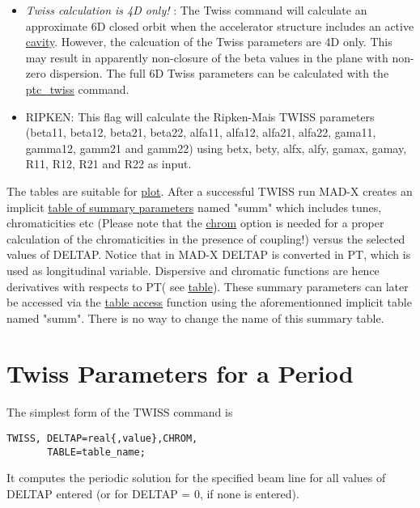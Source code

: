 \begin{itemize}
   \item \textit{ Twiss calculation is 4D only!} : The Twiss
     command will calculate an approximate 6D closed orbit when the
     accelerator structure includes an active
     \href{../Introduction/cavity.html}{cavity}. However, the
     calcuation of the Twiss parameters are 4D only. This may
     result in apparently non-closure of the beta values in the
     plane with non-zero dispersion. The full 6D Twiss parameters
     can be calculated with the
     \href{../ptc_twiss/ptc_twiss.html}{ptc\_twiss} command.    

   \item RIPKEN: This flag will calculate the Ripken-Mais TWISS
     parameters (beta11, beta12, beta21, beta22, alfa11, alfa12,
     alfa21, alfa22, gama11, gamma12, gamm21 and gamm22) using
     betx, bety, alfx, alfy, gamax, gamay, R11, R12, R21 and R22 as
     input.  

\end{itemize}

The tables are suitable for \href{../plot/plot.html}{plot}.   After a
successful TWISS run MAD-X creates an implicit
\href{../Introduction/tables.html#summ}{table of summary parameters}
named "summ" which includes tunes, chromaticities etc (Please note that
the \href{../Introduction/tables.html#chrom}{chrom} option is needed
for a proper calculation of the chromaticities in the presence of
coupling!) versus the selected values of DELTAP. Notice that in MAD-X
DELTAP is converted in PT, which is used as longitudinal
variable. Dispersive and chromatic functions are hence derivatives with
respects to PT( see
\href{../Introduction/tables.html#summ}{table}). These summary
parameters can later be accessed via the
\href{../Introduction/expression.html#table}{table access} function
using the aforementionned implicit table named "summ". There is no way
to change the name of this summary table.  

\section{Twiss Parameters for a Period}

The simplest form of the TWISS command is 
\begin{verbatim}
TWISS, DELTAP=real{,value},CHROM,
       TABLE=table_name;
\end{verbatim}

It computes the periodic solution for the specified beam line for all
values of DELTAP entered (or for DELTAP = 0, if none is entered).  

